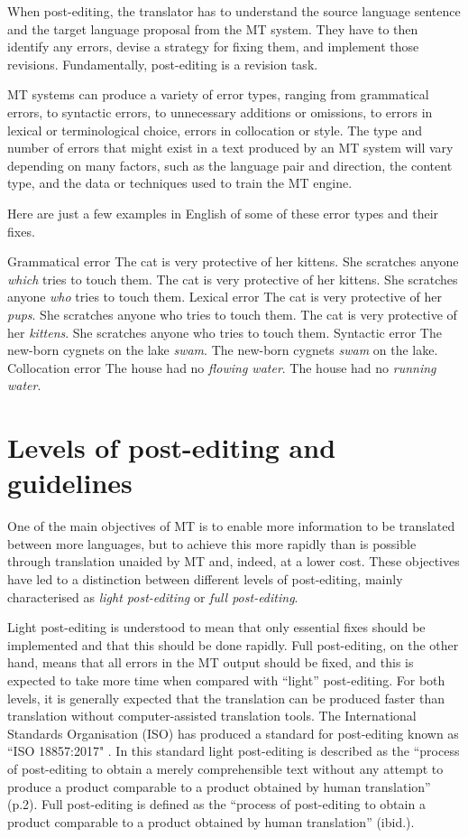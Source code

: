 \documentclass[output=paper,colorlinks,citecolor=brown]{langscibook}
\begin{document}
When post-editing, the translator has to understand the source language sentence and the target language proposal from the MT system. They have to then identify any errors, devise a strategy for fixing them, and implement those revisions. Fundamentally, post-editing is a revision task.

MT systems can produce a variety of error types, ranging from grammatical errors, to syntactic errors, to unnecessary additions or omissions, to errors in lexical or terminological choice, errors in collocation or style. The type and number of errors that might exist in a text produced by an MT system will vary depending on many factors, such as the language pair and direction, the content type, and the data or techniques used to train the MT engine.

Here are just a few examples in English of some of these error types and their fixes.

\ea
Grammatical error
\ea The cat is very protective of her kittens. She scratches anyone \textit{which} tries to touch them.
\ex The cat is very protective of her kittens. She scratches anyone \textit{who} tries to touch them.
\z
\ex
Lexical error
\ea The cat is very protective of her \textit{pups}. She scratches anyone who tries to touch them.
\ex The cat is very protective of her \textit{kittens}. She scratches anyone who tries to touch them.
\z
\ex
Syntactic error
\ea The new-born cygnets on the lake \textit{swam}.
\ex The new-born cygnets \textit{swam} on the lake.
\z
\ex
Collocation error
\ea The house had no \textit{flowing water}.
\ex The house had no \textit{running water}.
\z
\z

\section{Levels of post-editing and guidelines}\label{sec:obrien:2}

One of the main objectives of MT is to enable more information to be translated between more languages, but to achieve this more rapidly than is possible through translation unaided by MT and, indeed, at a lower cost. These objectives have led to a distinction between different levels of post-editing, mainly characterised as \textit{light post-editing} or \textit{full post-editing}.

Light post-editing is understood to mean that only essential fixes should be implemented and that this should be done rapidly. Full post-editing, on the other hand, means that all errors in the MT output should be fixed, and this is expected to take more time when compared with “light” post-editing. For both levels, it is generally expected that the translation can be produced faster than translation without computer-assisted translation tools. The International Standards Organisation (ISO) has produced a standard for post-editing known as “ISO 18857:2017" \citep{ISO2017}. In this standard light post-editing is described as the “process of post-editing to obtain a merely comprehensible text without any attempt to produce a product comparable to a product obtained by human translation” (p.2). Full post-editing is defined as the “process of post-editing to obtain a product comparable to a product obtained by human translation” (ibid.).
\end{document}
